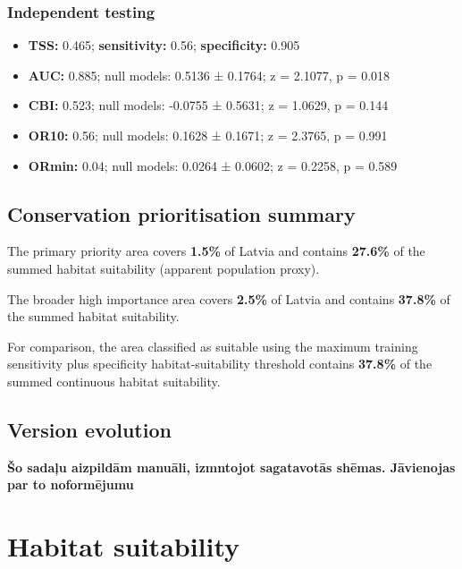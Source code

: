 \documentclass[
  openany]{book}
\providecommand{\tightlist}{%
  \setlength{\itemsep}{0pt}\setlength{\parskip}{0pt}}
\providecommand{\tightlist}{%
  \setlength{\itemsep}{0pt}%
  \setlength{\parskip}{0pt}%
}
\begin{document}
\subsubsection*{Independent testing}\label{independent-testing-14}

\begin{itemize}
\tightlist
\item
  \textbf{TSS:} 0.465; \textbf{sensitivity:} 0.56; \textbf{specificity:} 0.905
\item
  \textbf{AUC:} 0.885; null models: 0.5136 ± 0.1764; z = 2.1077, p = 0.018
\item
  \textbf{CBI:} 0.523; null models: -0.0755 ± 0.5631; z = 1.0629, p = 0.144
\item
  \textbf{OR10:} 0.56; null models: 0.1628 ± 0.1671; z = 2.3765, p = 0.991
\item
  \textbf{ORmin:} 0.04; null models: 0.0264 ± 0.0602; z = 0.2258, p = 0.589
\end{itemize}

\subsection*{Conservation prioritisation summary}\label{conservation-prioritisation-summary-14}

The primary priority area covers \textbf{1.5\%} of Latvia and contains \textbf{27.6\%} of the summed habitat suitability (apparent population proxy).

The broader high importance area covers \textbf{2.5\%} of Latvia and contains \textbf{37.8\%} of the summed habitat suitability.

For comparison, the area classified as suitable using the maximum training sensitivity plus specificity habitat-suitability threshold contains \textbf{37.8\%} of the summed continuous habitat suitability.

\subsection*{Version evolution}\label{version-evolution-14}

\textbf{Šo sadaļu aizpildām manuāli, izmntojot sagatavotās shēmas. Jāvienojas par to noformējumu}

\section*{Habitat suitability}\label{habitat-suitability-14}
\end{document}
